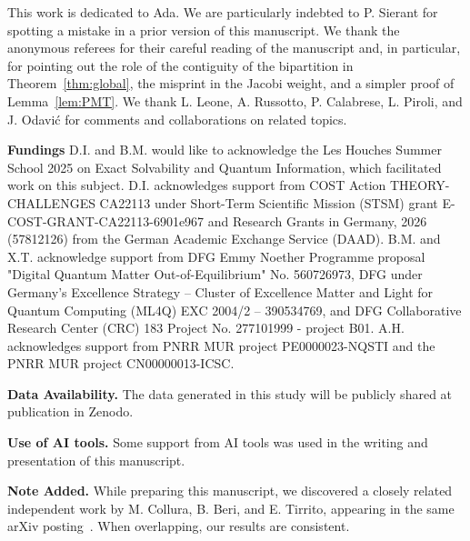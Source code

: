 \documentclass[prx,twocolumn,superscriptaddress,aps,10pt, frontmatterverbose, reprint,footinbib,longbibliography=true]{revtex4-2}
\providecommand{\DIFaddtex}[1]{{\protect\color{red}#1}} %
\providecommand{\DIFaddbegin}{\protect\color{red}} %
\providecommand{\DIFaddend}{\protect\color{black}} %
\providecommand{\DIFaddtex}[1]{\texorpdfstring{\DIFaddtex{#1}}{#1}} %
\providecommand{\DIFadd}[1]{\texorpdfstring{\DIFaddtex{#1}}{#1}} %
\newcommand{\DIFaddincludegraphics}[2][]{{\color{blue}\fbox{\DIFOincludegraphics[#1]{#2}}}} %
\DeclareRobustCommand{\DIFaddbegin}{\DIFOaddbegin \let\includegraphics\DIFaddincludegraphics} %
\DeclareRobustCommand{\DIFaddend}{\DIFOaddend \let\includegraphics\DIFOincludegraphics} %
\begin{document}
\begin{acknowledgments}
This work is dedicated to Ada. We are particularly indebted to P. Sierant for spotting a mistake in a prior version of this manuscript. We thank \DIFaddbegin \DIFadd{the anonymous referees for their careful reading of the manuscript and, in particular, for pointing out the role of the contiguity of the bipartition in Theorem~\ref{thm:global}, the misprint in the Jacobi weight, and a simpler proof of Lemma~\ref{lem:PMT}. 
We thank }\DIFaddend L. Leone, A. Russotto, P. Calabrese, L. Piroli, and J. Odavić for comments and collaborations on related topics.

\textbf{Fundings}
D.I. and B.M. would like to acknowledge the Les Houches Summer School 2025 on Exact Solvability and Quantum Information, which facilitated work on this subject.
D.I. acknowledges support from COST Action THEORY-CHALLENGES CA22113 under Short-Term Scientific Mission (STSM) grant E-COST-GRANT-CA22113-6901e967 and Research Grants in Germany, 2026 (57812126) from the German Academic Exchange Service (DAAD).  
B.M. and X.T. acknowledge support from DFG Emmy Noether Programme proposal "Digital Quantum Matter Out-of-Equilibrium" No. 560726973, DFG under Germany's Excellence Strategy – Cluster of Excellence Matter and Light for Quantum Computing (ML4Q) EXC 2004/2 – 390534769, and DFG Collaborative Research Center (CRC) 183 Project No. 277101999 - project B01. 
A.H. acknowledges support from  PNRR MUR project PE0000023-NQSTI and the PNRR MUR project CN00000013-ICSC.

\textbf{Data Availability.} The data generated in this study will be publicly shared at publication in Zenodo.

\DIFaddbegin \DIFadd{\textbf{Use of AI tools.} Some support from AI tools was used in the writing and presentation of this manuscript.
}

\DIFaddend %


\textbf{Note Added.}
While preparing this manuscript, we discovered a closely related independent work by M. Collura, B. Beri, and E. Tirrito, appearing in the same arXiv posting~\cite{collura2026nonlocalnonstabilizernessfreefermion}. 
When overlapping, our results are consistent.
\end{acknowledgments}
\clearpage
\end{document}
